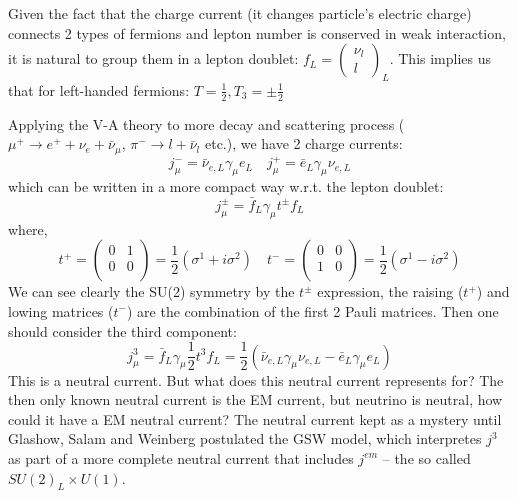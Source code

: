 Given the fact that the charge current (it changes particle's electric charge) 
connects 2 types of fermions and lepton number is conserved in weak interaction, 
it is natural to group them in a lepton doublet: $f_L = \begin{pmatrix} \nu_l \\ l \end{pmatrix}_L$.
This implies us that for left-handed fermions: $T=\frac{1}{2}, T_3 = \pm\frac{1}{2}$ 

Applying the V-A theory to more decay and scattering process (
$\mu^+ \rightarrow e^+ + \nu_e + \bar{\nu}_\mu$, $\pi^- \rightarrow l + \bar{\nu}_l$ etc.), 
we have 2 charge currents:
\begin{equation}
    j_\mu^- = \bar{\nu}_{e, L} \gamma_\mu e_L	\quad 
    j_\mu^+ = \bar{e}_L \gamma_\mu \nu_{e,L}
\end{equation}
which can be written in a more compact way w.r.t. the lepton doublet:
\begin{equation}
    j_\mu^\pm = \bar{f}_L \gamma_\mu t^\pm f_L
\end{equation}
where,
\begin{equation}
    t^+  =
    \begin{pmatrix}
	0   & 1	\\
	0   & 0	\\
    \end{pmatrix}
    = \frac{1}{2}(\sigma^1 + i\sigma^2)
    \quad
    t^-  =
    \begin{pmatrix}
	0   & 0	\\
	1   & 0	\\
    \end{pmatrix}
    = \frac{1}{2}(\sigma^1 - i\sigma^2)
\end{equation}
We can see clearly the SU(2) symmetry by the $t^\pm$ expression, the raising ($t^+$)
and lowing matrices ($t^-$) are the combination of the first 2 Pauli matrices.
Then one should consider the third component:
\begin{equation}
    j_\mu^3 = \bar{f}_L \gamma_\mu \frac{1}{2}t^3 f_L = \frac{1}{2} (\bar{\nu}_{e, L} \gamma_\mu \nu_{e, L} - \bar{e}_{L} \gamma_\mu e_L)
\end{equation}
This is a neutral current. But what does this neutral current represents for?
The then only known neutral current is the EM current, but neutrino is neutral, how
could it have a EM neutral current? The neutral current kept as a mystery until
Glashow, Salam and Weinberg postulated the GSW model, which interpretes $j^3$ as
part of a more complete neutral current that includes $j^{em}$ -- the so called
$SU(2)_L \times U(1)$.

